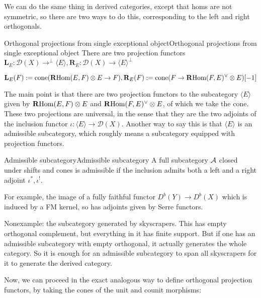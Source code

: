 We can do the same thing in derived categories, except that homs are not symmetric, so there are two ways to do this, corresponding to the left and right orthogonals.

\begin{definition}{Orthogonal projections from single exceptional object}{Orthogonal projections from single exceptional object}
    There are two projection functors $\mathbf{L}_E:\mathcal{D}(X)\rightarrow ^\perp\langle E\rangle , \mathbf{R}_E:\mathcal{D}(X)\rightarrow \langle E\rangle^\perp $

$$\mathbf{L}_E(F):=\mathrm{cone}(\operatorname{\mathbf{R}Hom}(E,F)\otimes E \rightarrow F), \mathbf{R}_E(F):=\mathrm{cone}(F\rightarrow \operatorname{\mathbf{R}Hom}(F,E)^\lor\otimes E )[-1]$$
\end{definition}

The main point is that there are two projection functors to the subcategory $\langle E \rangle$ given by $\operatorname{\mathbf{R}Hom}(E,F)\otimes E$ and $\operatorname{\mathbf{R}Hom}(F,E)^\lor\otimes E$, of which we take the cone. These two projections are universal, in the sense that they are the two adjoints of the inclusion functor $\iota:\langle E \rangle \rightarrow \mathcal{D}(X)$. Another way to say this is that $\langle E \rangle$ is an admissible subcategory, which roughly means a subcategory equipped with projection functors.

\begin{definition}{Admissible subcategory}{Admissible subcategory}
    A full subcategory $\mathcal{A}$ closed under shifts and cones is admissible if the inclusion admits both a left and a right adjoint $\iota^*, \iota^!$. 
\end{definition}

For example, the image of a fully faithful functor $D^b(Y)\to D^b(X)$ which is induced by a FM kernel, so has adjoints given by Serre functors.

Nonexample: the subcategory generated by skyscrapers. This has empty orthogonal complement, but everything in it has finite support. But if one has an admissible subcategory with empty orthogonal, it actually generates the whole category. So it is enough for an admissible subcategory to span all skyscrapers for it to generate the derived category.

Now, we can proceed in the exact analogous way to define orthogonal projection functors, by taking the cones of the unit and counit morphisms:


